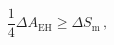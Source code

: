\begin{equation}
\frac{1}{4} \Delta A_{\text{EH}} \geq \Delta S_{\text{m}}\, ,
\label{eqgsl}
\end{equation}

